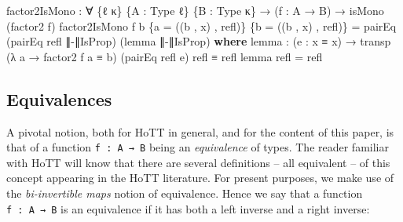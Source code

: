 \documentclass[
  11pt,
  oneside,
  article]{memoir}
\newenvironment{Shaded}{}{}
\newcommand{\KeywordTok}[1]{\textcolor[rgb]{0.00,0.44,0.13}{\textbf{#1}}}
\newcommand{\NormalTok}[1]{#1}
\newcommand{\OtherTok}[1]{\textcolor[rgb]{0.00,0.44,0.13}{#1}}
\theoremstyle{definition}
\theoremstyle{plain}
\newcommand{\0}{\textsf{0}}
\newcommand{\1}{\tn{\textsf{1}}}
\begin{document}
\begin{Shaded}
\begin{Highlighting}[]
\NormalTok{factor2IsMono }\OtherTok{:} \OtherTok{∀} \OtherTok{\{}\NormalTok{ℓ κ}\OtherTok{\}} \OtherTok{\{}\NormalTok{A }\OtherTok{:}\NormalTok{ Type ℓ}\OtherTok{\}} \OtherTok{\{}\NormalTok{B }\OtherTok{:}\NormalTok{ Type κ}\OtherTok{\}}
                \OtherTok{→} \OtherTok{(}\NormalTok{f }\OtherTok{:}\NormalTok{ A }\OtherTok{→}\NormalTok{ B}\OtherTok{)} \OtherTok{→}\NormalTok{ isMono }\OtherTok{(}\NormalTok{factor2 f}\OtherTok{)}
\NormalTok{factor2IsMono f b }\OtherTok{\{}\NormalTok{a }\OtherTok{=} \OtherTok{((}\NormalTok{b\textquotesingle{} , x}\OtherTok{)}\NormalTok{ , refl}\OtherTok{)\}} \OtherTok{\{}\NormalTok{b }\OtherTok{=} \OtherTok{((}\NormalTok{b\textquotesingle{}\textquotesingle{} , x\textquotesingle{}}\OtherTok{)}\NormalTok{ , refl}\OtherTok{)\}} \OtherTok{=} 
\NormalTok{    pairEq }\OtherTok{(}\NormalTok{pairEq refl ∥{-}∥IsProp}\OtherTok{)} \OtherTok{(}\NormalTok{lemma ∥{-}∥IsProp}\OtherTok{)}
    \KeywordTok{where}\NormalTok{ lemma }\OtherTok{:} \OtherTok{(}\NormalTok{e }\OtherTok{:}\NormalTok{ x ≡ x\textquotesingle{}}\OtherTok{)} \OtherTok{→}\NormalTok{ transp }\OtherTok{(λ}\NormalTok{ a }\OtherTok{→}\NormalTok{ factor2 f a ≡ b}\OtherTok{)} 
                                        \OtherTok{(}\NormalTok{pairEq refl e}\OtherTok{)}\NormalTok{ refl ≡ refl}
\NormalTok{          lemma refl }\OtherTok{=}\NormalTok{ refl}
\end{Highlighting}
\end{Shaded}

\subsection{Equivalences}\label{equivalences}

A pivotal notion, both for HoTT in general, and for the content of this
paper, is that of a function \texttt{f\ :\ A\ →\ B} being an
\emph{equivalence} of types. The reader familiar with HoTT will know
that there are several definitions -- all equivalent -- of this concept
appearing in the HoTT literature. For present purposes, we make use of
the \emph{bi-invertible maps} notion of equivalence. Hence we say that a
function \texttt{f\ :\ A\ →\ B} is an equivalence if it has both a left
inverse and a right inverse:
\end{document}
